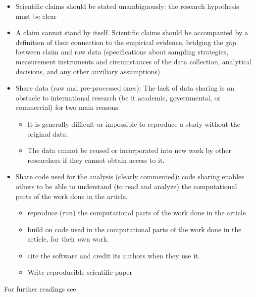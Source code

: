 \documentclass[
]{article}
\providecommand{\tightlist}{%
  \setlength{\itemsep}{0pt}\setlength{\parskip}{0pt}}
\begin{document}
\begin{itemize}
\tightlist
\item
  Scientific claims should be stated unambiguously: the research
  hypothesis must be clear
\item
  A claim cannot stand by itself. Scientific claims should be
  accompanied by a definition of their connection to the empirical
  evidence, bridging the gap between claim and raw data (specifications
  about sampling strategies, measurement instruments and circumstances
  of the data collection, analytical decisions, and any other auxiliary
  assumptions)
\item
  Share data (raw and pre-processed ones): The lack of data sharing is
  an obstacle to international research (be it academic, governmental,
  or commercial) for two main reasons:

  \begin{itemize}
  \tightlist
  \item
    It is generally difficult or impossible to reproduce a study without
    the original data.
  \item
    The data cannot be reused or incorporated into new work by other
    researchers if they cannot obtain access to it.
  \end{itemize}
\item
  Share code used for the analysis (clearly commented): code sharing
  enables others to be able to understand (to read and analyze) the
  computational parts of the work done in the article.

  \begin{itemize}
  \tightlist
  \item
    reproduce (run) the computational parts of the work done in the
    article.
  \item
    build on code used in the computational parts of the work done in
    the article, for their own work.
  \item
    cite the software and credit its authors when they use it.
  \item
    Write reproducible scientific paper
  \end{itemize}
\end{itemize}

For further readings see
\end{document}
